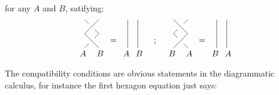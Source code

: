 \documentclass{article}
\begin{document}
for any $A$ and $B$, satifying:
\begin{equation}
\begin{gathered}
\begin{tikzpicture}[scale=0.6, whit/.style={draw,regular polygon,
	regular polygon sides=4,fill=white}, black/.style={draw,regular polygon, regular polygon sides=4,fill=black}]
\node (0) at (0.5,0.5) {};
\node (1) at (-0.1,-0.4) {$A$};
\node (2) at (1.1,-0.4) {$B$};
\node (3) at (0.5,1.5) {};
\draw (1,0)--(0,1)--(1,2);
\draw (0,0)--(0)--(1,1)--(3)--(0,2);
\end{tikzpicture}
\end{gathered}
\, = \,
\begin{gathered}
\begin{tikzpicture}[scale=0.6, whit/.style={draw,regular polygon,
	regular polygon sides=4,fill=white}, black/.style={draw,regular polygon, regular polygon sides=4,fill=black}]
\node (1) at (0,-0.4) {$A$};
\node (2) at (0.9,-0.4) {$B$};
\draw (0.8,0)--(0.8,2);
\draw (0.1,0)--(0.1,2);
\end{tikzpicture}
\end{gathered}
\quad;\quad
\begin{gathered}
\begin{tikzpicture}[scale=0.6, whit/.style={draw,regular polygon,
	regular polygon sides=4,fill=white}, black/.style={draw,regular polygon, regular polygon sides=4,fill=black}]
\node (0) at (0.5,0.5) {};
\node (1) at (-0.1,-0.4) {$B$};
\node (2) at (1.1,-0.4) {$A$};
\node (3) at (0.5,1.5) {};
\draw (1,0)--(0)--(0,1)-- (3)--(1,2);
\draw (0,0)--(1,1)--(0,2);
\end{tikzpicture}
\end{gathered}
\, = \,
\begin{gathered}
\begin{tikzpicture}[scale=0.6, whit/.style={draw,regular polygon,
	regular polygon sides=4,fill=white}, black/.style={draw,regular polygon, regular polygon sides=4,fill=black}]
\node (1) at (0,-0.4) {$B$};
\node (2) at (0.9,-0.4) {$A$};
\draw (0.8,0)--(0.8,2);
\draw (0.1,0)--(0.1,2);
\end{tikzpicture}
\end{gathered}
\end{equation}
The compatibility conditions are obvious statements in the diagrammatic calculus, for instance the first hexagon equation just says:
\end{document}

